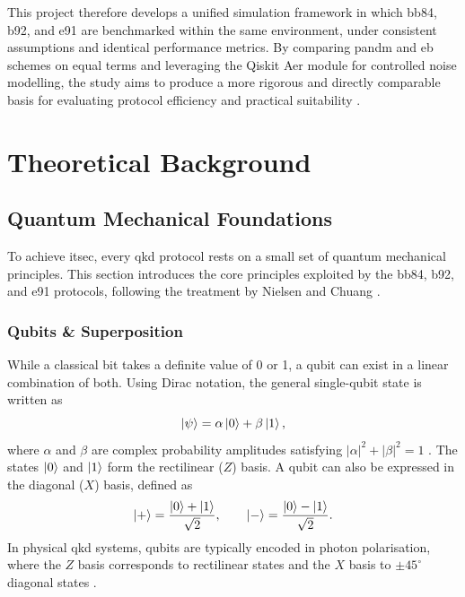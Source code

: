 \documentclass[11pt, a4paper]{report}
\begin{document}
This project therefore develops a unified simulation framework in which \gls{bb84}, \gls{b92}, and \gls{e91} are benchmarked within the same environment, under consistent assumptions and identical performance metrics. By comparing \gls{pandm} and \gls{eb} schemes on equal terms and leveraging the Qiskit Aer module for controlled noise modelling, the study aims to produce a more rigorous and directly comparable basis for evaluating protocol efficiency and practical suitability \cite{QiskitAer}.



\chapter{Theoretical Background}

\section{Quantum Mechanical Foundations}

To achieve \gls{itsec}, every \gls{qkd} protocol rests on a small set of quantum mechanical principles. This section introduces the core principles exploited by the \gls{bb84}, \gls{b92}, and \gls{e91} protocols, following the treatment by Nielsen and Chuang \cite{QKDbible}.

\subsection{Qubits \& Superposition}
While a classical bit takes a definite value of 0 or 1, a \gls{qubit} can exist in a linear combination of both. Using Dirac notation, the general single-\gls{qubit} state is written as
%
\begin{equation}
\label{eq:qubit}
\ket{\psi} = \alpha\ket{0} + \beta\ket{1},
\end{equation}
%
where $\alpha$ and $\beta$ are complex probability amplitudes satisfying $|\alpha|^{2}+|\beta|^{2}=1$ \cite{QKDbible}. The states $\ket{0}$ and $\ket{1}$ form the rectilinear ($Z$) basis. A \gls{qubit} can also be expressed in the diagonal ($X$) basis, defined as
%
\begin{equation}
\label{eq:diag-basis}
\ket{+} = \frac{\ket{0}+\ket{1}}{\sqrt{2}}, \qquad
\ket{-} = \frac{\ket{0}-\ket{1}}{\sqrt{2}}.
\end{equation}
%
In physical \gls{qkd} systems, \glspl{qubit} are typically encoded in photon polarisation, where the $Z$ basis corresponds to rectilinear states and the $X$ basis to $\pm 45^{\circ}$ diagonal states \cite{BB84}. 
\end{document}
